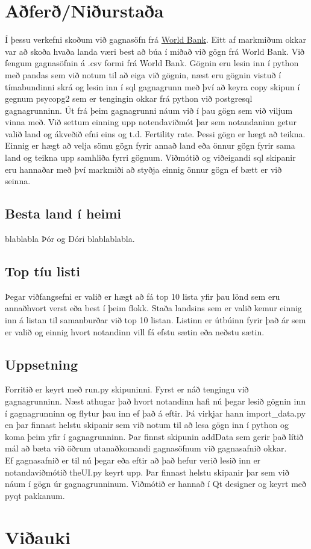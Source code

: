 \documentclass[11pt,a4paper]{amsart}
\theoremstyle{plain}
\theoremstyle{definition}
\theoremstyle{remark}
\begin{document}


\section{Aðferð/Niðurstaða}
Í þessu verkefni skoðum við gagnasöfn frá \href{http://data.worldbank.org/data-catalog/world-development-indicators}{World Bank}. Eitt af markmiðum okkar var að skoða hvaða landa væri best að búa í miðað við gögn frá World Bank. Við fengum gagnasöfnin á .csv formi frá World Bank. Gögnin eru lesin inn í python með pandas sem við notum til að eiga við gögnin, næst eru gögnin vistuð í tímabundinni skrá og lesin inn í sql gagnagrunn með því að keyra copy skipun í gegnum psycopg2 sem er tengingin okkar frá python við postgresql gagnagrunninn. Út frá þeim gagnagrunni náum við í þau gögn sem við viljum vinna með. Við settum einning upp notendaviðmót þar sem notandaninn getur valið land og ákveðið efni eins og t.d. Fertility rate. Þessi gögn er hægt að teikna. Einnig er hægt að velja sömu gögn fyrir annað land eða önnur gögn fyrir sama land og teikna upp samhliða fyrri gögnum. Viðmótið og viðeigandi sql skipanir eru hannaðar með því markmiði að styðja einnig önnur gögn ef bætt er við seinna.


\subsection{Besta land í heimi}
blablabla Þór og Dóri blablablabla.

\subsection{Top tíu listi}
Þegar viðfangsefni er valið er hægt að fá top 10 lista yfir þau lönd sem eru annaðhvort verst eða best í þeim flokk. Staða landsins sem er valið kemur einnig inn á listan til samanburðar við top 10 listan. Listinn er útbúinn fyrir það ár sem er valið og einnig hvort notandinn vill fá efstu sætin eða neðstu sætin.


\subsection{Uppsetning}
Forritið er keyrt með run.py skipuninni. Fyrst er náð tengingu við gagnagrunninn. Næst athugar það hvort notandinn hafi nú þegar lesið gögnin inn í gagnagrunninn og flytur þau inn ef það á eftir. Þá virkjar hann import\_data.py en þar finnast helstu skipanir sem við notum til að lesa gögn inn í python og koma þeim yfir í gagnagrunninn. Þar finnst skipunin addData sem gerir það lítið mál að bæta við öðrum utanaðkomandi gagnasöfnum við gagnasafnið okkar.\\
Ef gagnasafnið er til nú þegar eða eftir að það hefur verið lesið inn er notandaviðmótið theUI.py keyrt upp. Þar finnast helstu skipanir þar sem við náum í gögn úr gagnagrunninum. Viðmótið er hannað í Qt designer og keyrt með pyqt pakkanum.

\newpage

\section{Viðauki}
\end{document}
